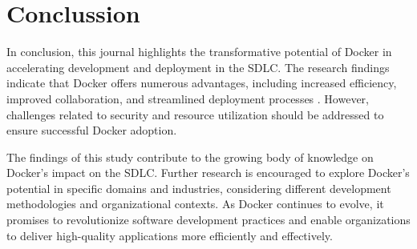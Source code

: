 \section{Conclussion}

In conclusion, this journal highlights the transformative potential of Docker in accelerating development and deployment in the SDLC. The research findings indicate that Docker offers numerous advantages, including increased efficiency, improved collaboration, and streamlined deployment processes \citep{bisht2016containerization,arora2018performance}. However, challenges related to security and resource utilization should be addressed to ensure successful Docker adoption.

The findings of this study contribute to the growing body of knowledge on Docker's impact on the SDLC. Further research is encouraged to explore Docker's potential in specific domains and industries, considering different development methodologies and organizational contexts. As Docker continues to evolve, it promises to revolutionize software development practices and enable organizations to deliver high-quality applications more efficiently and effectively.